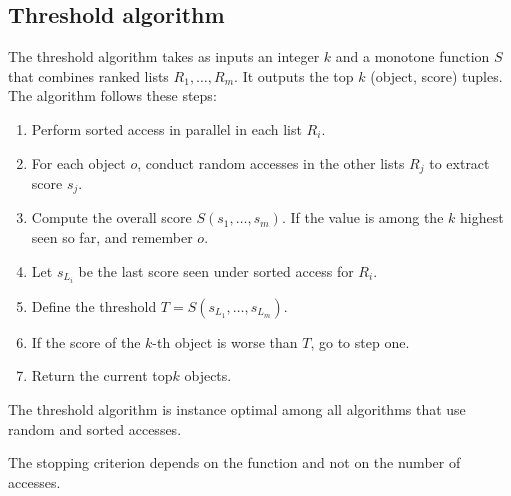 \subsection{Threshold algorithm}
The threshold algorithm takes as inputs an integer $k$ and a monotone function $S$ that combines ranked lists $R_1,\dots,R_m$. 
It outputs the top $k$ (object, score) tuples. 
The algorithm follows these steps:
\begin{enumerate}
    \item Perform sorted access in parallel in each list $R_i$. 
    \item For each object $o$, conduct random accesses in the other lists $R_j$ to extract score $s_j$. 
    \item Compute the overall score $S(s_1, \dots, s_m)$. 
        If the value is among the $k$ highest seen so far, and remember $o$. 
    \item Let $s_{L_i}$ be the last score seen under sorted access for $R_i$. 
    \item Define the threshold $T=S(s_{L_1}, \dots, s_{L_m})$. 
    \item If the score of the $k$-th object is worse than $T$, go to step one. 
    \item Return the current top$k$ objects. 
\end{enumerate}
\begin{property}
    The threshold algorithm is instance optimal among all algorithms that use random and sorted accesses. 
\end{property}
The stopping criterion depends on the function and not on the number of accesses. 
